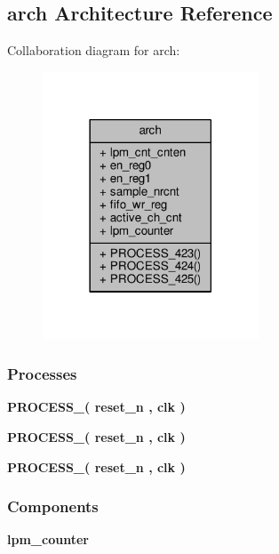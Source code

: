 \subsection{arch Architecture Reference}
\label{classsample__nr__cnt__mimo_1_1arch}


Collaboration diagram for arch\+:\nopagebreak
\begin{figure}[H]
\begin{center}
\leavevmode
\includegraphics[width=182pt]{d0/da6/classsample__nr__cnt__mimo_1_1arch__coll__graph}
\end{center}
\end{figure}
\subsubsection*{Processes}
 \begin{DoxyCompactItemize}
\item 
{\bf P\+R\+O\+C\+E\+S\+S\+\_}{\bfseries  ( {\bfseries {\bfseries {\bf reset\+\_\+n}} \textcolor{vhdlchar}{ }} , {\bfseries {\bfseries {\bf clk}} \textcolor{vhdlchar}{ }} )}
\item 
{\bf P\+R\+O\+C\+E\+S\+S\+\_}{\bfseries  ( {\bfseries {\bfseries {\bf reset\+\_\+n}} \textcolor{vhdlchar}{ }} , {\bfseries {\bfseries {\bf clk}} \textcolor{vhdlchar}{ }} )}
\item 
{\bf P\+R\+O\+C\+E\+S\+S\+\_}{\bfseries  ( {\bfseries {\bfseries {\bf reset\+\_\+n}} \textcolor{vhdlchar}{ }} , {\bfseries {\bfseries {\bf clk}} \textcolor{vhdlchar}{ }} )}
\end{DoxyCompactItemize}
\subsubsection*{Components}
 \begin{DoxyCompactItemize}
\item 
{\bf lpm\+\_\+counter}  {\bfseries }  
\end{DoxyCompactItemize}
